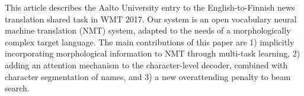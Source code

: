 This article describes the Aalto University entry to the English-to-Finnish news translation shared task in WMT 2017. Our system is an open vocabulary neural machine translation (NMT) system, adapted to the needs of a morphologically complex target language. The main contributions of this paper are 1) implicitly incorporating morphological information to NMT through multi-task learning, 2) adding an attention mechanism to the character-level decoder, combined with character segmentation of names, and 3) a new overattending penalty to beam search.

